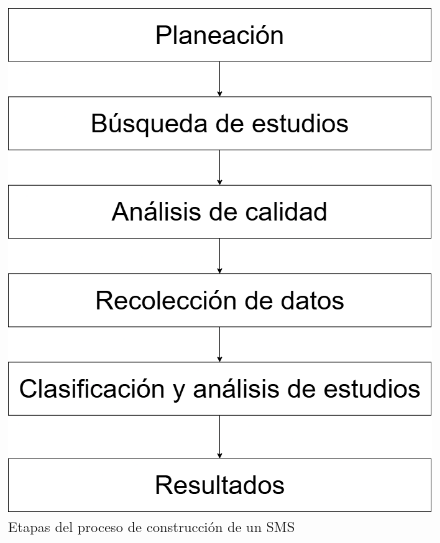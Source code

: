 \begin{figure}[htbp]
	\centering
	\includegraphics[width=0.9\linewidth]{resources/figures/sms-Etapas.drawio.png}
	\caption{Etapas del proceso de construcción de un SMS}
	\label{figure:Stages}
\end{figure}












